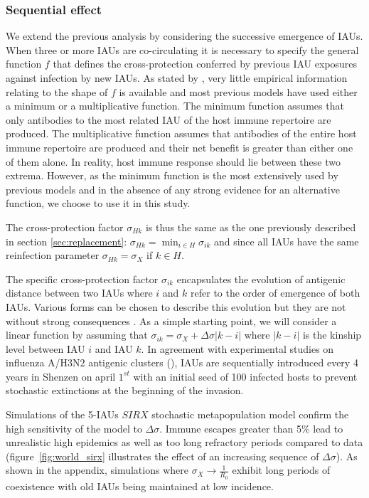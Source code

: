 \subsubsection{Sequential effect}
\label{sec:seqeff}
We extend the previous analysis by considering the successive emergence of
IAUs. When three or more IAUs are co-circulating it is
necessary to specify the general function $f$ that defines the cross-protection conferred by previous IAU exposures against infection by new IAUs. As stated by \citet{Adams2007a}, very
little empirical information relating to the shape of $f$ is available and most
previous models have used either a minimum or a multiplicative function.  The
minimum function assumes that only antibodies to the most related IAU of the host immune repertoire are produced. The multiplicative function assumes
that antibodies of the entire host immune repertoire are produced and their net
benefit is greater than either one of them alone. In reality, host immune response should lie between these two extrema. However, as the minimum
function is the most extensively used by previous models and in the absence
of any strong evidence for an alternative function, we choose to use it in
this study.

The cross-protection factor $\sigma_{Hk}$ is thus the same as the one previously described in section \ref{sec:replacement}: $\sigma_{Hk}=\min_{i\in H}\sigma_{ik}$ and since all IAUs have the same reinfection parameter $\sigma_{Hk}=\sigma_{X}$ if $k\in H$.

The specific cross-protection factor $\sigma_{ik}$ encapsulates the
evolution of antigenic distance between two IAUs where $i$ and $k$
refer to the order of emergence of both IAUs. Various forms can be
chosen to describe this evolution but they are not without strong
consequences \citep{Adams2007a}. As a simple starting point, we will
consider a linear function by assuming that $\sigma_{ik} = \sigma_{X}
+ \Delta\sigma |k-i|$ where $|k-i|$ is the kinship level between IAU
$i$ and IAU $k$. In agreement with experimental studies on influenza
A/H3N2 antigenic clusters (\citet{Smith2004}), IAUs are sequentially
introduced every 4 years in Shenzen on april $1^{st}$ with an initial
seed of 100 infected hosts to prevent stochastic extinctions at the
beginning of the invasion.

Simulations of the 5-IAUs $SIRX$ stochastic metapopulation model
confirm the high sensitivity of the model to $\Delta\sigma$. Immune
escapes greater than 5\% lead to unrealistic high epidemics as well as
too long refractory periods compared to data
(figure~\ref{fig:world_sirx} illustrates the effect of an increasing
sequence of $\Delta\sigma$). As shown in the appendix, simulations
where $\sigma_{X} \to \frac{1}{R_0}$ exhibit long periods of
coexistence with old IAUs being maintained at low incidence.

